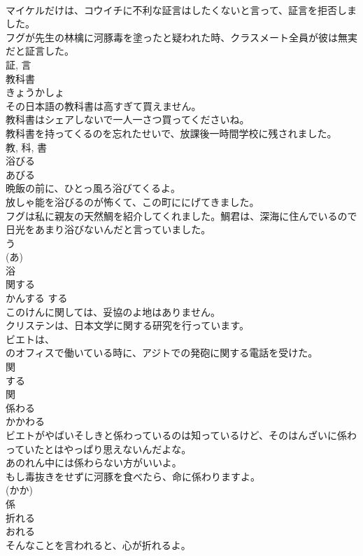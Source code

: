 \documentclass[8pt]{extreport}
\begin{document}
\begin{CJK}{UTF8}{min}
\\	マイケルだけは、コウイチに不利な証言はしたくないと言って、証言を拒否しました。	
\\	フグが先生の林檎に河豚毒を塗ったと疑われた時、クラスメート全員が彼は無実だと証言した。	
\\	証, 言	
\\	教科書	
\\	きょうかしょ	
\\	その日本語の教科書は高すぎて買えません。	
\\	教科書はシェアしないで一人一さつ買ってくださいね。	
\\	教科書を持ってくるのを忘れたせいで、放課後一時間学校に残されました。	
\\	教, 科, 書	
\\	浴びる	
\\	あびる	
\\	晩飯の前に、ひとっ風ろ浴びてくるよ。	
\\	放しゃ能を浴びるのが怖くて、この町ににげてきました。	
\\	フグは私に親友の天然鯛を紹介してくれました。鯛君は、深海に住んでいるので日光をあまり浴びないんだと言っていました。	
\\	う 
\\	(あ) 
\\	浴	
\\	関する	
\\	かんする	する 
\\	このけんに関しては、妥協のよ地はありません。	
\\	クリステンは、日本文学に関する研究を行っています。	
\\	ビエトは、
\\	のオフィスで働いている時に、アジトでの発砲に関する電話を受けた。	
\\	関 
\\	する 
\\	関	
\\	係わる	
\\	かかわる	
\\	ビエトがやばいそしきと係わっているのは知っているけど、そのはんざいに係わっていたとはやっぱり思えないんだよな。	
\\	あのれん中には係わらない方がいいよ。	
\\	もし毒抜きをせずに河豚を食べたら、命に係わりますよ。	
\\	(かか) 
\\	係	
\\	折れる	
\\	おれる	
\\	そんなことを言われると、心が折れるよ。	

\end{CJK}
\end{document}
